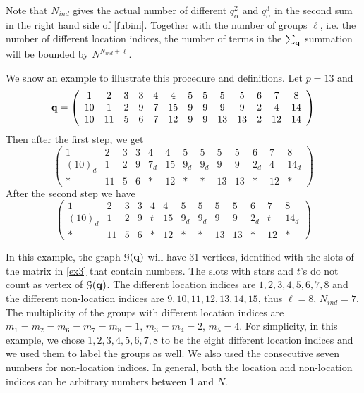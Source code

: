 \documentclass[draft]{article}
\newcommand{\bq}{{\bf {q}}}
\newcommand{\al}{\alpha}
\newcommand{\be}{\begin{equation}}
\newcommand{\ee}{\end{equation}}
\newcommand{\cG}{{\mathcal G}}
\numberwithin{equation}{section}
\numberwithin{theorem}{section}
\numberwithin{definition}{section}
\numberwithin{remark}{section}
\begin{document}
 Note that $N_{ind}$ gives the actual number of different
$q^2_\al$ and $q^3_\al$ in the second sum in the right hand side of \eqref{fubini}.
Together with the number of groups $\ell$, i.e. the number of
different location indices, the number of terms in the $\sum_\bq$
summation will be bounded by $N^{N_{ind}+\ell}$.



\medskip

We show an example to illustrate this procedure and definitions. Let $p=13$ and 
\be
\bq=\left(\begin{array}{ccccccccccccc}1 & 2 & 3 & 3 & 4 & 4&  5 & 5&  5& 5 & 6 & 7&8
 \\10 & 1 & 2 & 9 & 7 &15 & 9& 9&   9 &9 & 2 & 4&14 
\\10 & 11 & 5 & 6& 7 &12 &9  & 9&13& 13  & 2& 12&14\end{array}\right)
\ee
Then after the first step, we get 
\be
\left(\begin{array}{ccccccccccccc}1 & 2 & 3 & 3 & 4 &4& 5& 5 &5&5 & 6 & 7&8 \\
 (10)_d & 1 & 2 & 9& 7_d&15& 9_d & 9_d&9&9 & 2_d & 4 &14_d\\ 
\ast & 11 & 5 & 6 &\ast &  12 & \ast 
& \ast&13&13 & \ast & 12& \ast \end{array}\right)
\ee
After the second step we have 
\be\label{ex3}
\left(\begin{array}{ccccccccccccc}1 & 2 & 3 & 3 & 4&4& 5 & 5&5&5 & 6 & 7&8 \\
 (10)_d & 1 & 2 & 9& t &15& 9_d  & 9_d&9&9  & 2_d & t &14_d\\ 
\ast & 11 & 5 & 6& \ast &12 & \ast & \ast &13&13& \ast & 12&\ast\end{array}\right)
\ee

In this example, the graph $\cG(\bq)$ will have 31 vertices,
identified with the slots of the matrix in \eqref{ex3} that contain numbers. 
The slots with stars and $t$'s do not count as vertex of $\cG(\bq)$.
The different  location indices are $1, 2, 3,4, 5,6,7,8$
and the different  non-location 
 indices are $9, 10, 11, 12, 13, 14, 15$, thus $\ell=8$, $N_{ind}=7$.
The multiplicity of the groups with different location
indices are $m_1=m_2=m_6=m_7=m_8=1$, $m_3= m_4=2$, $m_5=4$.
For simplicity, in this example, we chose $1, 2, 3,4, 5,6,7,8$
to be the eight different location indices and we used them
to label the groups as well. We also used the consecutive
seven numbers for non-location indices. In general, both the location 
and non-location indices can
be arbitrary numbers between 1 and $N$.
\end{document}

